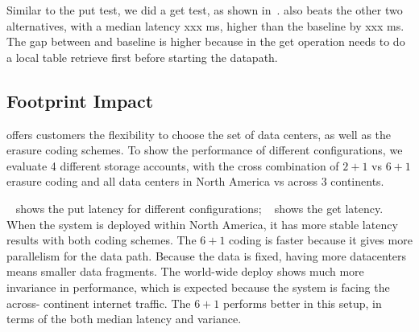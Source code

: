 Similar to the put test, we did a \name get test, as shown in~. 
\name also beats the other two alternatives, with a median latency xxx ms, higher than 
the baseline by xxx ms. The gap between \name and baseline is higher because in the get 
operation \name needs to do a local table retrieve first before starting the datapath. 






\subsection{Footprint Impact}



\name offers customers the flexibility to choose the set of data centers, as well as the 
erasure coding schemes. To show the performance of different configurations, we evaluate 
4 different \name storage accounts, with the cross combination of $2+1$ vs $6+1$ erasure 
coding and all data centers in North America vs across 3 continents.

~ shows the put latency for different configurations; 
~ shows the get latency. When the system is deployed within 
North America, it has more stable latency results with both coding schemes. The $6+1$ coding
is faster because it gives more parallelism for the data path. Because the data is fixed, 
having more datacenters means smaller data fragments. The world-wide deploy shows much 
more invariance in performance, which is expected because the system is facing the across-
continent internet traffic. The $6+1$ performs better in this setup, in terms of the 
both median latency and variance. 



